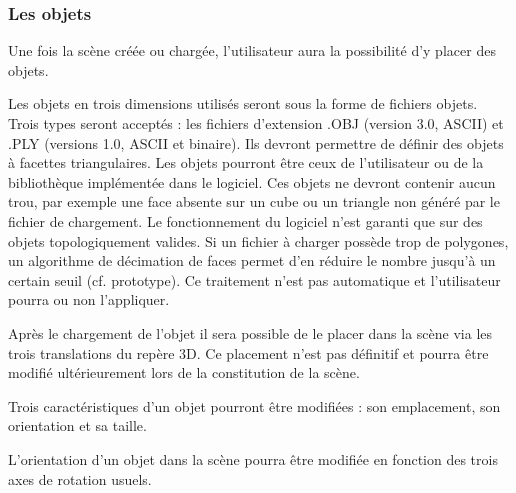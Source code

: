 \subsubsection{Les objets}
Une fois la scène créée ou chargée, l’utilisateur aura la possibilité d’y placer des objets.

\begin{description}[style=nextline]
	\item[Chargement des fichiers objets]
	\mbox{\hspace{1cm}} Les objets en trois dimensions utilisés seront sous la forme de fichiers objets. Trois types seront acceptés : les fichiers d’extension .OBJ (version 3.0, ASCII) et .PLY (versions 1.0, ASCII et binaire). Ils devront permettre de définir des objets à facettes triangulaires. Les objets pourront être ceux de l’utilisateur ou de la bibliothèque implémentée dans le logiciel. \newline
	\mbox{\hspace{1cm}}Ces objets ne devront contenir aucun trou, par exemple une face absente sur un cube ou un triangle non généré par le fichier de chargement. Le fonctionnement du logiciel n’est garanti que sur des objets topologiquement valides. \newline
	\mbox{\hspace{1cm}}Si un fichier à charger possède trop de polygones, un algorithme de décimation de faces permet d’en réduire le nombre jusqu’à un certain seuil (cf. prototype). Ce traitement n’est pas automatique et l’utilisateur pourra ou non l’appliquer.
	
	\item[Placement d'un objet]
	\mbox{\hspace{1cm}} Après le chargement de l’objet il sera possible de le placer dans la scène via les trois translations du repère 3D. Ce placement n’est pas définitif et pourra être modifié ultérieurement lors de la constitution de la scène.
	
	\item[Modification d'un objet]
	\mbox{\hspace{1cm}}Trois caractéristiques d’un objet pourront être modifiées : son emplacement, son orientation et sa taille.
	
	\item[Modification de l'orientation d'un objet]
		\mbox{\hspace{1cm}}	L’orientation d’un objet dans la scène pourra être modifiée en fonction des trois axes de rotation usuels.
	

\end{description}
